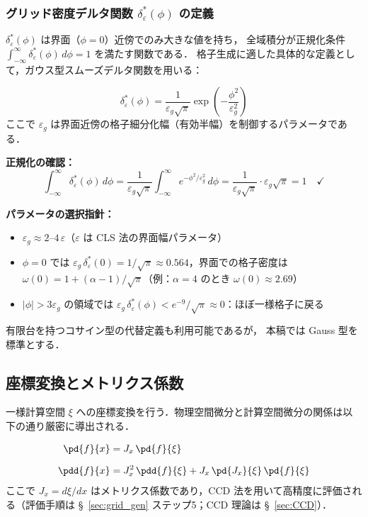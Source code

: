 \subsubsection{グリッド密度デルタ関数 \texorpdfstring{$\delta_\varepsilon^*(\phi)$}{delta*eps(phi)} の定義}

$\delta_\varepsilon^*(\phi)$ は界面（$\phi=0$）近傍でのみ大きな値を持ち，
全域積分が正規化条件 $\int_{-\infty}^{\infty}\delta_\varepsilon^*(\phi)\,d\phi = 1$ を満たす関数である．
格子生成に適した具体的な定義として，ガウス型スムーズデルタ関数を用いる：

\begin{equation}
  \delta_\varepsilon^*(\phi) =
  \frac{1}{\varepsilon_g\sqrt{\pi}}\exp\!\left(-\frac{\phi^2}{\varepsilon_g^2}\right)
  \label{eq:grid_delta}
\end{equation}
ここで $\varepsilon_g$ は界面近傍の格子細分化幅（有効半幅）を制御するパラメータである．

\textbf{正規化の確認：}
\[
  \int_{-\infty}^{\infty} \delta_\varepsilon^*(\phi)\,d\phi
  = \frac{1}{\varepsilon_g\sqrt{\pi}}\int_{-\infty}^{\infty}e^{-\phi^2/\varepsilon_g^2}\,d\phi
  = \frac{1}{\varepsilon_g\sqrt{\pi}} \cdot \varepsilon_g\sqrt{\pi} = 1 \quad \checkmark
\]

\textbf{パラメータの選択指針：}
\begin{itemize}
  \item $\varepsilon_g \approx 2\text{--}4 \, \varepsilon$（$\varepsilon$ は CLS 法の界面幅パラメータ）
  \item $\phi = 0$ では $\varepsilon_g\,\delta_\varepsilon^*(0) = 1/\sqrt{\pi} \approx 0.564$，界面での格子密度は $\omega(0) = 1 + (\alpha-1)/\sqrt{\pi}$（例：$\alpha = 4$ のとき $\omega(0) \approx 2.69$）
  \item $|\phi| > 3\varepsilon_g$ の領域では $\varepsilon_g\,\delta_\varepsilon^*(\phi) < e^{-9}/\sqrt{\pi} \approx 0$：ほぼ一様格子に戻る
\end{itemize}

有限台を持つコサイン型の代替定義も利用可能であるが，
本稿では Gauss 型を標準とする．

\subsection{座標変換とメトリクス係数}

一様計算空間 $\xi$ への座標変換を行う．物理空間微分と計算空間微分の関係は以下の通り厳密に導出される．

\begin{align}
 \pd{f}{x} &= J_x\,\pd{f}{\xi}
 \label{eq:transform_1st_correct} \\[6pt]
 \pdd{f}{x} &= J_x^2\,\pdd{f}{\xi} + J_x\,\pd{J_x}{\xi}\,\pd{f}{\xi}
 \label{eq:transform_2nd_correct}
\end{align}
ここで $J_x = d\xi/dx$ はメトリクス係数であり，CCD 法を用いて高精度に評価される（評価手順は §~\ref{sec:grid_gen} ステップ5；CCD 理論は §~\ref{sec:CCD}）．

